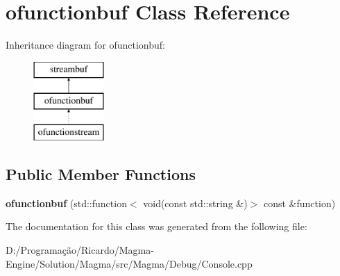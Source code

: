 \hypertarget{classofunctionbuf}{}\section{ofunctionbuf Class Reference}
\label{classofunctionbuf}
Inheritance diagram for ofunctionbuf\+:\begin{figure}[H]
\begin{center}
\leavevmode
\includegraphics[height=3.000000cm]{classofunctionbuf}
\end{center}
\end{figure}
\subsection*{Public Member Functions}
\begin{DoxyCompactItemize}
\item 
\mbox{\label{classofunctionbuf_ac4c827b2738de8c625a1316e15643f3d}} 
{\bfseries ofunctionbuf} (std\+::function$<$ void(const std\+::string \&)$>$ const \&function)
\end{DoxyCompactItemize}


The documentation for this class was generated from the following file\+:\begin{DoxyCompactItemize}
\item 
D\+:/\+Programação/\+Ricardo/\+Magma-\/\+Engine/\+Solution/\+Magma/src/\+Magma/\+Debug/Console.\+cpp\end{DoxyCompactItemize}
